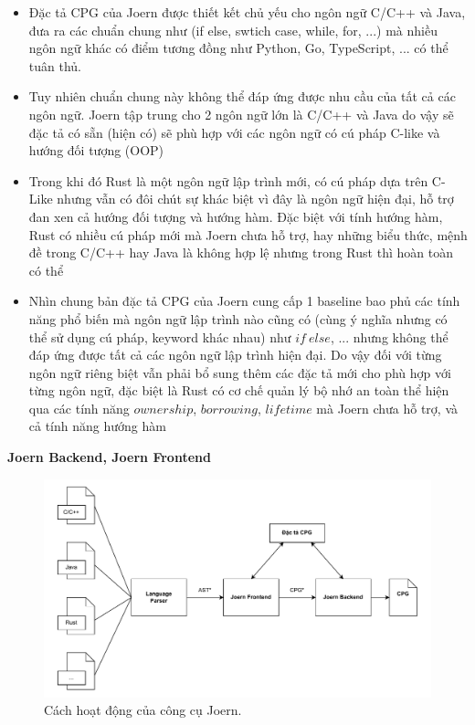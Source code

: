 \begin{itemize}
  \item Đặc tả CPG của Joern được thiết kết chủ yếu cho ngôn ngữ C/C++ và Java, đưa ra các chuẩn chung như (if else, swtich case, while, for, ...) mà nhiều ngôn ngữ khác có điểm tương đồng như Python, Go, TypeScript, ... có thể tuân thủ.
  \item Tuy nhiên chuẩn chung này không thể đáp ứng được nhu cầu của tất cả các ngôn ngữ. Joern tập trung cho 2 ngôn ngữ lớn là C/C++ và Java do vậy sẽ đặc tả có sẵn (hiện có) sẽ phù hợp với các ngôn ngữ có cú pháp C-like và hướng đối tượng (OOP)
  \item Trong khi đó Rust là một ngôn ngữ lập trình mới, có cú pháp dựa trên C-Like nhưng vẫn có đôi chút sự khác biệt vì đây là ngôn ngữ hiện đại, hỗ trợ đan xen cả hướng đối tượng và hướng hàm. Đặc biệt với tính hướng hàm, Rust có nhiều cú pháp mới mà Joern chưa hỗ trợ, hay những biểu thức, mệnh đề trong C/C++ hay Java là không hợp lệ nhưng trong Rust thì hoàn toàn có thể
  \item Nhìn chung bản đặc tả CPG của Joern cung cấp 1 baseline bao phủ các tính năng phổ biến mà ngôn ngữ lập trình nào cũng có (cùng ý nghĩa nhưng có thể sử dụng cú pháp, keyword khác nhau) như $if\ else$, ... nhưng không thể đáp ứng được tất cả các ngôn ngữ lập trình hiện đại. Do vậy đối với từng ngôn ngữ riêng biệt vẫn phải bổ sung thêm các đặc tả mới cho phù hợp với từng ngôn ngữ, đặc biệt là Rust có cơ chế quản lý bộ nhớ an toàn thể hiện qua các tính năng $ownership$, $borrowing$, $lifetime$ mà Joern chưa hỗ trợ, và cả tính năng hướng hàm
\end{itemize}

\textbf{Joern Backend, Joern Frontend}

\begin{figure}[H]
  \includegraphics[width=1\columnwidth]{figures/c2/c2_frontend_backend.drawio.pdf}
  \centering
  \caption{Cách hoạt động của công cụ Joern.}
  \label{img:c2_frontend_backend}
\end{figure}

